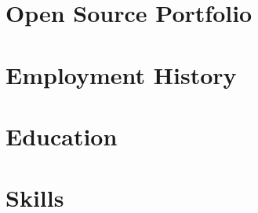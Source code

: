 \documentclass[9pt]{resume}
\begin{document}
\maketitle

\section{Open Source Portfolio}




\section{Employment History}




\section{Education}


\section{Skills}










\end{document}
